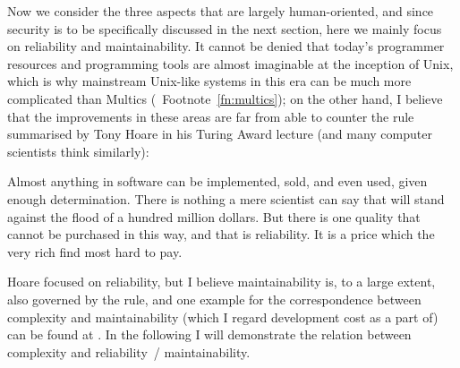 Now we consider the three aspects that are largely human-oriented, and since
security is to be specifically discussed in the next section, here we mainly
focus on reliability and maintainability.  It cannot be denied that today's
programmer resources and programming tools are almost imaginable at the
inception of Unix, which is why mainstream Unix-like systems in this era can
be much more complicated than Multics (\cf~Footnote~\ref{fn:multics}); on the
other hand, I believe that the improvements in these areas are far from able
to counter the rule summarised by Tony Hoare in his Turing Award lecture%
 (and many computer scientists think similarly):
\begin{quoting}
	Almost anything in software can be implemented, sold, and even used, given
	enough determination.  There is nothing a mere scientist can say that will
	stand against the flood of a hundred million dollars.  But there is one
	quality that cannot be purchased in this way, and that is reliability.
	It is a price which the very rich find most hard to pay.
\end{quoting}
Hoare focused on reliability, but I believe maintainability is, to a large
extent, also governed by the rule, and one example for the correspondence
between complexity and maintainability (which I regard development cost as a
part of) can be found at \parencite{rbrander2017}.  In the following I will
demonstrate the relation between complexity and reliability~/ maintainability.

